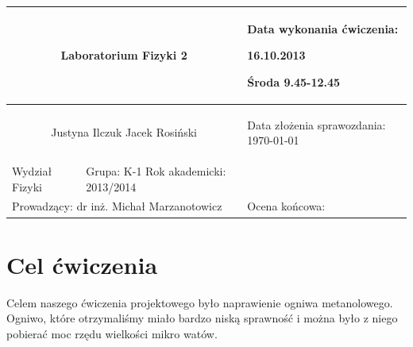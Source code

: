 \documentclass[a4paper,12pt]{article}
\author{Justyna Ilczuk, Jacek Rosiński}
\begin{document}
\begin{center}

    \begin{tabular}{ | m{5cm}| m{5cm} | m{5cm} |}
    \hline 
    \multicolumn{2}{|c|}{{ \Large \textbf{Laboratorium Fizyki 2}} }
    &  
    \begin{center}
    Data wykonania ćwiczenia:
    \end{center}
    \begin{center}
      16.10.2013 
    \end{center}
    \begin{center}
    Środa 9.45-12.45
    \end{center}
     \\ 
    
    \hline
    \multicolumn{2}{|c|}{Justyna Ilczuk \newline Jacek Rosiński}
    & \begin{center}
    {\small Data złożenia sprawozdania:} \newline \today
    \end{center}   \\
   	
   	\hline
    Wydział Fizyki & Grupa: K-1 \newline Rok akademicki: 2013/2014 &  \\
   	\hline
   	\multicolumn{2}{|l|}{Prowadzący: dr inż. Michał Marzanotowicz} & \multicolumn{1}{|l|}{Ocena końcowa:}\\
    \hline
    \end{tabular}
\end{center}

\newpage

\pagestyle{fancy}
\fancyfoot[CO]{\ }
\fancyhead[RO]{\footnotesize{\thepage} }




\section{Cel ćwiczenia}

Celem naszego ćwiczenia projektowego było naprawienie ogniwa metanolowego. Ogniwo, które otrzymaliśmy miało bardzo niską sprawność i można było z niego pobierać moc rzędu wielkości mikro watów.
\end{document}
